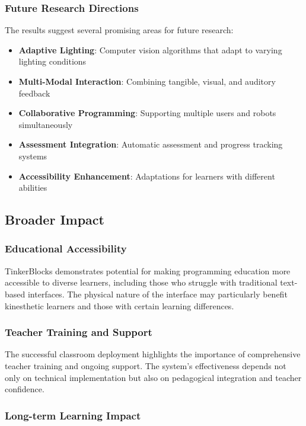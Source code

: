\subsubsection{Future Research Directions}

The results suggest several promising areas for future research:

\begin{itemize}
    \item \textbf{Adaptive Lighting}: Computer vision algorithms that adapt to varying lighting conditions
    \item \textbf{Multi-Modal Interaction}: Combining tangible, visual, and auditory feedback
    \item \textbf{Collaborative Programming}: Supporting multiple users and robots simultaneously
    \item \textbf{Assessment Integration}: Automatic assessment and progress tracking systems
    \item \textbf{Accessibility Enhancement}: Adaptations for learners with different abilities
\end{itemize}

\subsection{Broader Impact}

\subsubsection{Educational Accessibility}

TinkerBlocks demonstrates potential for making programming education more accessible to diverse learners, including those who struggle with traditional text-based interfaces. The physical nature of the interface may particularly benefit kinesthetic learners and those with certain learning differences.

\subsubsection{Teacher Training and Support}

The successful classroom deployment highlights the importance of comprehensive teacher training and ongoing support. The system's effectiveness depends not only on technical implementation but also on pedagogical integration and teacher confidence.

\subsubsection{Long-term Learning Impact}

